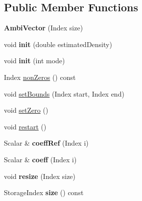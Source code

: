 \subsection*{Public Member Functions}
\begin{DoxyCompactItemize}
\item 
\mbox{\label{class_eigen_1_1internal_1_1_ambi_vector_afb66420a0d27371392ee1761fd0eb9de}} 
{\bfseries Ambi\+Vector} (Index size)
\item 
\mbox{\label{class_eigen_1_1internal_1_1_ambi_vector_a8824e2cbbfa61753c6e064b92a731eeb}} 
void {\bfseries init} (double estimated\+Density)
\item 
\mbox{\label{class_eigen_1_1internal_1_1_ambi_vector_a40729cc09277bda3d5098d5fdc9e1b9d}} 
void {\bfseries init} (int mode)
\item 
Index \mbox{\hyperlink{class_eigen_1_1internal_1_1_ambi_vector_ae0b137e95f52dea2320c16c379d27e74}{non\+Zeros}} () const
\item 
void \mbox{\hyperlink{class_eigen_1_1internal_1_1_ambi_vector_a8a37e06682a29a63239d914de342096c}{set\+Bounds}} (Index start, Index end)
\item 
void \mbox{\hyperlink{class_eigen_1_1internal_1_1_ambi_vector_af472b476758307bcc1621d9eb4018f6a}{set\+Zero}} ()
\item 
void \mbox{\hyperlink{class_eigen_1_1internal_1_1_ambi_vector_a518fc22cdfa37e5340350e2a69fa8f1a}{restart}} ()
\item 
\mbox{\label{class_eigen_1_1internal_1_1_ambi_vector_abf2564636a686b847f75ecefd1a510b1}} 
Scalar \& {\bfseries coeff\+Ref} (Index i)
\item 
\mbox{\label{class_eigen_1_1internal_1_1_ambi_vector_a1b093606074026acb73415c6c81a7437}} 
Scalar \& {\bfseries coeff} (Index i)
\item 
\mbox{\label{class_eigen_1_1internal_1_1_ambi_vector_a1cf1919df3994163c459503c2b3d6ff9}} 
void {\bfseries resize} (Index size)
\item 
\mbox{\label{class_eigen_1_1internal_1_1_ambi_vector_a40b55429f5cba5a5673369ee552897fd}} 
Storage\+Index {\bfseries size} () const
\end{DoxyCompactItemize}
